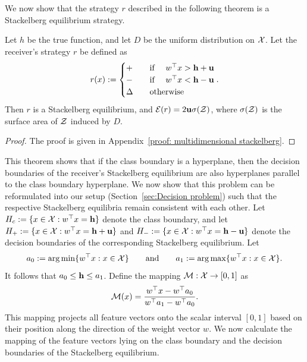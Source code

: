 We now show that the strategy $r$ described in the following theorem is a Stackelberg equilibrium strategy.
\begin{thm}\label{thm: multidimensional Stackelberg}
Let $h$ be the true function, and let $D$ be the uniform distribution on $\mathcal{X}$. Let the receiver's strategy $r$ be defined as
\[
r(x) := 
\begin{cases}
\mathbf{+} & \hbox{\quad if \quad} w^\top x > \mathbf{h} + \mathbf{u} \\
\mathbf{-} & \hbox{\quad if \quad} w^\top x < \mathbf{h} - \mathbf{u} \\
\Delta & \hbox{\quad otherwise\quad}
\end{cases}.
\]
Then $r$ is a Stackelberg equilibrium, and $\mathcal{E}(r) = 2\mathbf{u}\sigma(\mathcal{Z})$, where $\sigma(\mathcal{Z})$ is the surface area of $\mathcal{Z}$ induced by $D$.
\end{thm}

\begin{proof}
    The proof is given in Appendix~\ref{proof: multidimensional stackelberg}.
\end{proof}
This theorem shows that if the class boundary is a hyperplane, then the decision boundaries of the receiver's Stackelberg equilibrium are also hyperplanes parallel to the class boundary hyperplane.
We now show that this problem can be reformulated into our setup (Section~\ref{sec:Decision problem}) such that the respective Stackelberg equilibria remain consistent with each other.
Let $H_c := \{x \in \mathcal{X} : w^\top x = \mathbf{h}\}$ denote the class boundary, and let $H_+ := \{x \in \mathcal{X}: w^\top x = \mathbf{h} + \mathbf{u} \}$ and $H_- := \{x \in \mathcal{X}: w^\top x = \mathbf{h} - \mathbf{u}\}$ denote the decision boundaries of the corresponding Stackelberg equilibrium. Let 
\[
a_0 := \arg\min\{w^\top x: x \in \mathcal{X}\} \quad \hbox{\quad and\quad} \quad a_1 := \arg\max\{w^\top x: x \in \mathcal{X}\}.
\]
It follows that $a_0 \leq \mathbf{h} \leq a_1$.
Define the mapping $\mathcal{M}: \mathcal{X} \to [0,1]$ as
\[
\mathcal{M}(x) = \frac{w^\top x - w^\top a_0}{w^\top a_1 - w^\top a_0}.
\]
This mapping projects all feature vectors onto the scalar interval $[0,1]$ based on their position along the direction of the weight vector $w$. We now calculate the mapping of the feature vectors lying on the class boundary and the decision boundaries of the Stackelberg equilibrium.

